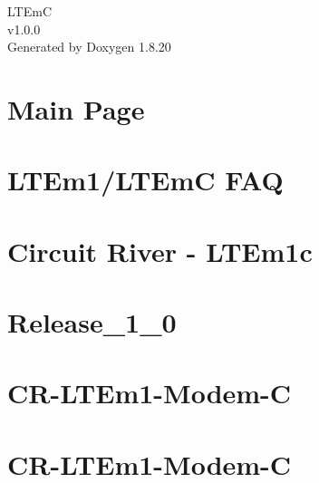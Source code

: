 \let\mypdfximage\pdfximage\def\pdfximage{\immediate\mypdfximage}\documentclass[twoside]{book}
\newcommand{\+}{\discretionary{\mbox{\scriptsize$\hookleftarrow$}}{}{}}
\newcommand{\clearemptydoublepage}{%
  \newpage{\pagestyle{empty}\cleardoublepage}%
}
\begin{document}
\hypersetup{pageanchor=false,
             bookmarksnumbered=true,
             pdfencoding=unicode
            }
\begin{titlepage}
\vspace*{7cm}
\begin{center}%
{\Large L\+T\+EmC \\[1ex]\large v1.\+0.\+0 }\\
\vspace*{1cm}
{\large Generated by Doxygen 1.8.20}\\
\end{center}
\end{titlepage}
\clearemptydoublepage
{}
\tableofcontents
\clearemptydoublepage
{}
\hypersetup{pageanchor=true}

\chapter{Main Page}
\label{index}\hypertarget{index}{}
\chapter{L\+T\+Em1/\+L\+T\+EmC F\+AQ}
\label{md__l_t_em1-_f_a_q}

\chapter{Circuit River -\/ L\+T\+Em1c}
\label{md__r_e_a_d_m_e}

\chapter{Release\+\_\+1\+\_\+0}
\label{md__release_1_0}

\chapter{C\+R-\/\+L\+T\+Em1-\/\+Modem-\/C}
\label{md_tests__l_t_em_c-1-platform__r_e_a_d_m_e}

\chapter{C\+R-\/\+L\+T\+Em1-\/\+Modem-\/C}
\label{md_tests__l_t_em_c-2-components__r_e_a_d_m_e}

\end{document}

